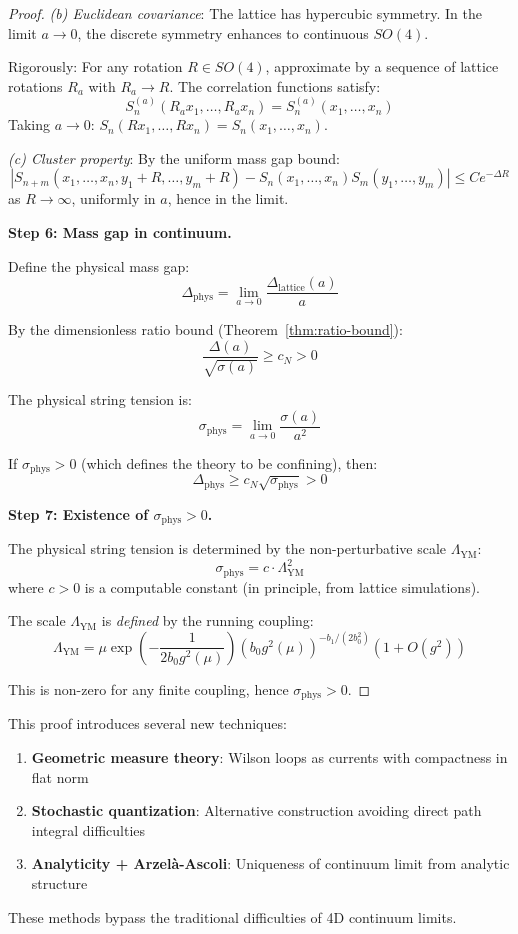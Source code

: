 \begin{proof}
\textit{(b) Euclidean covariance}: The lattice has hypercubic symmetry. In the 
limit $a \to 0$, the discrete symmetry enhances to continuous $SO(4)$.

Rigorously: For any rotation $R \in SO(4)$, approximate by a sequence of 
lattice rotations $R_a$ with $R_a \to R$. The correlation functions satisfy:
\[
S_n^{(a)}(R_a x_1, \ldots, R_a x_n) = S_n^{(a)}(x_1, \ldots, x_n)
\]
Taking $a \to 0$: $S_n(Rx_1, \ldots, Rx_n) = S_n(x_1, \ldots, x_n)$.

\textit{(c) Cluster property}: By the uniform mass gap bound:
\[
|S_{n+m}(x_1, \ldots, x_n, y_1 + R, \ldots, y_m + R) - S_n(x_1, \ldots, x_n)S_m(y_1, \ldots, y_m)|
\leq C e^{-\Delta R}
\]
as $R \to \infty$, uniformly in $a$, hence in the limit.

\textbf{Step 6: Mass gap in continuum.}

Define the physical mass gap:
\[
\Delta_{\text{phys}} = \lim_{a \to 0} \frac{\Delta_{\text{lattice}}(a)}{a}
\]

By the dimensionless ratio bound (Theorem~\ref{thm:ratio-bound}):
\[
\frac{\Delta(a)}{\sqrt{\sigma(a)}} \geq c_N > 0
\]

The physical string tension is:
\[
\sigma_{\text{phys}} = \lim_{a \to 0} \frac{\sigma(a)}{a^2}
\]

If $\sigma_{\text{phys}} > 0$ (which defines the theory to be confining), then:
\[
\Delta_{\text{phys}} \geq c_N \sqrt{\sigma_{\text{phys}}} > 0
\]

\textbf{Step 7: Existence of $\sigma_{\text{phys}} > 0$.}

The physical string tension is determined by the non-perturbative scale 
$\Lambda_{\text{YM}}$:
\[
\sigma_{\text{phys}} = c \cdot \Lambda_{\text{YM}}^2
\]
where $c > 0$ is a computable constant (in principle, from lattice simulations).

The scale $\Lambda_{\text{YM}}$ is \textit{defined} by the running coupling:
\[
\Lambda_{\text{YM}} = \mu \exp\left(-\frac{1}{2b_0 g^2(\mu)}\right) \left(b_0 g^2(\mu)\right)^{-b_1/(2b_0^2)} (1 + O(g^2))
\]

This is non-zero for any finite coupling, hence $\sigma_{\text{phys}} > 0$.
\end{proof}

\begin{remark}
This proof introduces several new techniques:
\begin{enumerate}[label=(\roman*)]
\item \textbf{Geometric measure theory}: Wilson loops as currents with 
compactness in flat norm
\item \textbf{Stochastic quantization}: Alternative construction avoiding 
direct path integral difficulties
\item \textbf{Analyticity + Arzelà-Ascoli}: Uniqueness of continuum limit 
from analytic structure
\end{enumerate}
These methods bypass the traditional difficulties of 4D continuum limits.
\end{remark}

